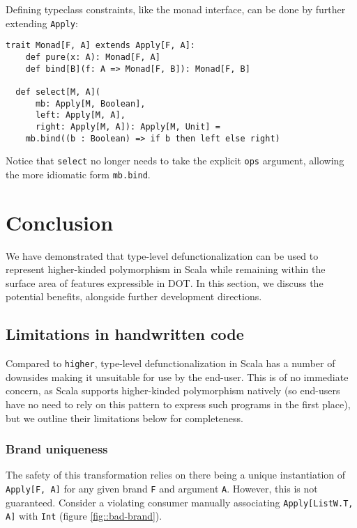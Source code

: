 \documentclass[acmsmall,screen]{acmart}
\begin{document}
Defining typeclass constraints, like the monad interface, can be done by
further extending \texttt{Apply}:
\begin{lstlisting}[style=scala]
  trait Monad[F, A] extends Apply[F, A]:
    def pure(x: A): Monad[F, A]
    def bind[B](f: A => Monad[F, B]): Monad[F, B]

  def select[M, A](
      mb: Apply[M, Boolean],
      left: Apply[M, A],
      right: Apply[M, A]): Apply[M, Unit] =
    mb.bind((b : Boolean) => if b then left else right)
\end{lstlisting}

Notice that \texttt{select} no longer needs to take the explicit \texttt{ops}
argument, allowing the more idiomatic form \texttt{mb.bind}.

\section{Conclusion}\label{sec::reflection}

We have demonstrated that type-level defunctionalization can be used to
represent higher-kinded polymorphism in Scala while remaining within the
surface area of features expressible in DOT. In this section, we discuss the
potential benefits, alongside further development directions.

\subsection{Limitations in handwritten code}

Compared to \texttt{higher}, type-level defunctionalization in Scala has a
number of downsides making it unsuitable for use by the end-user. This is of no
immediate concern, as Scala supports higher-kinded polymorphism natively (so
end-users have no need to rely on this pattern to express such programs in the
first place), but we outline their limitations below for completeness.

\subsubsection{Brand uniqueness}\label{sec::brands}

The safety of this transformation relies on there being a unique instantiation
of \texttt{Apply[F, A]} for any given brand \texttt{F} and argument \texttt{A}.
However, this is not guaranteed. Consider a violating consumer manually
associating \texttt{Apply[ListW.T, A]} with \texttt{Int} (figure
\ref{fig::bad-brand}).
\end{document}
